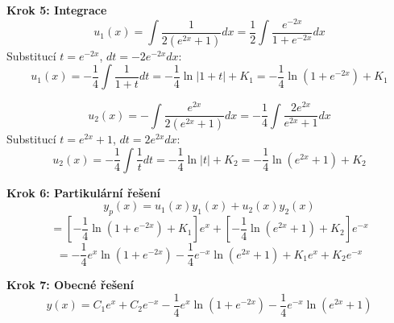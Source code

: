 \begin{example}
\vspace{1\baselineskip}

\noindent\textbf{Krok 5: Integrace}
\[
u_1(x) = \int \frac{1}{2(e^{2x} + 1)} dx = \frac{1}{2} \int \frac{e^{-2x}}{1 + e^{-2x}} dx
\]
Substitucí $t = e^{-2x}$, $dt = -2e^{-2x}dx$:
\[
u_1(x) = -\frac{1}{4} \int \frac{1}{1 + t} dt = -\frac{1}{4} \ln|1 + t| + K_1 = -\frac{1}{4} \ln(1 + e^{-2x}) + K_1
\]

\vspace{0.5\baselineskip}

\[
u_2(x) = -\int \frac{e^{2x}}{2(e^{2x} + 1)} dx = -\frac{1}{4} \int \frac{2e^{2x}}{e^{2x} + 1} dx
\]
Substitucí $t = e^{2x} + 1$, $dt = 2e^{2x}dx$:
\[
u_2(x) = -\frac{1}{4} \int \frac{1}{t} dt = -\frac{1}{4} \ln|t| + K_2 = -\frac{1}{4} \ln(e^{2x} + 1) + K_2
\]

\vspace{1\baselineskip}

\noindent\textbf{Krok 6: Partikulární řešení}
\[
y_p(x) = u_1(x)y_1(x) + u_2(x)y_2(x)
\]
\[
= \left[-\frac{1}{4} \ln(1 + e^{-2x}) + K_1\right]e^{x} + \left[-\frac{1}{4} \ln(e^{2x} + 1) + K_2\right]e^{-x}
\]
\[
= -\frac{1}{4}e^{x}\ln(1 + e^{-2x}) - \frac{1}{4}e^{-x}\ln(e^{2x} + 1) + K_1e^{x} + K_2e^{-x}
\]

\vspace{1\baselineskip}

\noindent\textbf{Krok 7: Obecné řešení}
\[
y(x) = C_1 e^{x} + C_2 e^{-x} - \frac{1}{4}e^{x}\ln(1 + e^{-2x}) - \frac{1}{4}e^{-x}\ln(e^{2x} + 1)
\]

\end{example}

